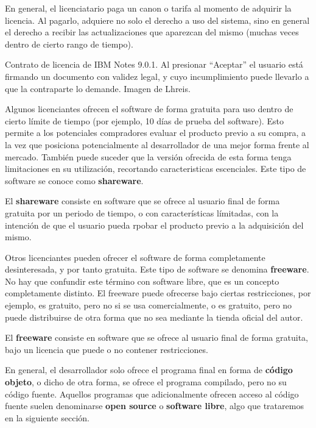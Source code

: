 En general, el licenciatario paga un canon o tarifa al momento de adquirir la
licencia. Al pagarlo, adquiere no solo el derecho a uso del sistema, sino en general
el derecho a recibir las actualizaciones que aparezcan del mismo (muchas veces
dentro de cierto rango de tiempo). 

{Contrato de licencia de IBM Notes 9.0.1. Al presionar ``Aceptar'' el usuario
está firmando un documento con validez legal, y cuyo incumplimiento puede
llevarlo a que la contraparte lo demande.}
{Imagen de Lhreis.}

Algunos licenciantes ofrecen el software de forma gratuita para uso dentro de
cierto límite de tiempo (por ejemplo, 10 días de prueba del software). Esto
permite a los potenciales compradores evaluar el producto previo a su compra,
a la vez que posiciona potencialmente al desarrollador de una mejor forma frente
al mercado. También puede suceder que la versión ofrecida de esta forma tenga
limitaciones en su utilización, recortando caracteristicas escenciales. Este
tipo de software se conoce como \textbf{shareware}.

\begin{definition}
    El \textbf{shareware} consiste en software que se ofrece al usuario final de
    forma gratuita por un periodo de tiempo, o con características límitadas,
    con la intención de que el usuario pueda rpobar el producto previo a
    la adquisición del mismo.\autocite{mw_shareware_2018}
\end{definition}

Otros licenciantes pueden ofrecer el software de forma completamente desinteresada,
y por tanto gratuita. Este tipo de software se denomina \textbf{freeware}. No
hay que confundir este término con software libre, que es un concepto completamente
distinto. El freeware puede ofrecerse bajo ciertas restricciones, por ejemplo,
es gratuito, pero no si se usa comercialmente, o es gratuito, pero no puede
distribuirse de otra forma que no sea mediante la tienda oficial del autor.

\begin{definition}
    El \textbf{freeware} consiste en software que se ofrece al usuario final de
    forma gratuita, bajo un licencia que puede o no contener restricciones.\autocite{mw_freeware_2018}
\end{definition}

En general, el desarrollador solo ofrece el programa final en forma de
\textbf{código objeto}, o dicho de otra forma, se ofrece el programa compilado,
pero no su código fuente. Aquellos programas que adicionalmente ofrecen acceso
al código fuente suelen denominarse \textbf{open source} o \textbf{software libre},
algo que trataremos en la siguiente sección.

